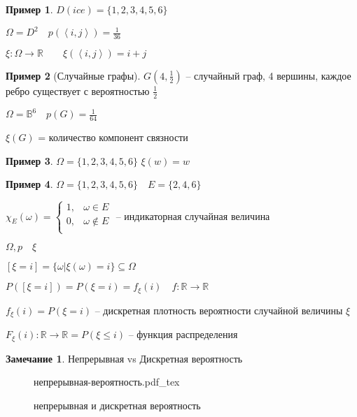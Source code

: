 \documentclass{book}
\newcommand\R{\ensuremath{\mathbb{R}}}
\theoremstyle{definition}
\newtheorem*{note}{Замечание}
\newtheorem*{example}{Пример}
\newcommand{\incfig}[1]{%
    \def\svgwidth{\columnwidth}
    {#1.pdf_tex}
}
\begin{document}
\begin{example}
    $D(ice) = \{1, 2, 3, 4, 5, 6 \}$

    $\Omega = D^2\quad p\left( \left<i, j \right> \right) =\frac{1}{36}$ 

    $\xi: \Omega \to  \R\qquad \xi(\left<i, j \right>) = i+j$
\end{example}

\begin{example}
    [Случайные графы]

    $G(4, \frac{1}{2})$ -- случайный граф, 4 вершины, каждое ребро существует с вероятностью $\frac{1}{2}$ 

    $\Omega = \mathds{B}^6\quad p(G) = \frac{1}{64}$

    $\xi(G)$ = количество компонент связности
\end{example}

\begin{example}
    $\Omega = \{1, 2, 3, 4, 5,6\}$
$\xi(w) = w$
\end{example}
\begin{example}
    $\Omega = \{1, 2, 3, 4, 5, 6\}\quad E = \{2, 4, 6\}$

    $\chi_E(\omega) = \begin{cases}
        1,& \omega\in E\\
        0,&\omega \not\in E\\
    \end{cases}$ -- индикаторная случайная величина
\end{example}

\begin{definition}
    $\Omega, p\quad \xi$

    $\left[ \xi = i \right]  = \{\omega |  \xi(\omega) = i\}\subseteq \Omega$

    $P\left( \left[ \xi = i \right]  \right)  = P\left( \xi = i \right)  = f_{\xi}(i)\quad f:\R\to \R$

    $f_{\xi}(i) = P\left( \xi = i \right) $ -- дискретная плотность вероятности случайной величины $\xi$

    $F_{\xi}(i):\R\to \R = P\left( \xi\leqslant i \right) $ -- функция распределения


\end{definition}

\begin{note}

    Непрерывная vs Дискретная вероятность
    
\begin{figure}[ht]
    \centering
    \incfig{непрерывная-вероятность}
    \caption{непрерывная и дискретная вероятность}
    \label{fig:непрерывная-вероятность}
\end{figure}
\end{note}
\end{document}
